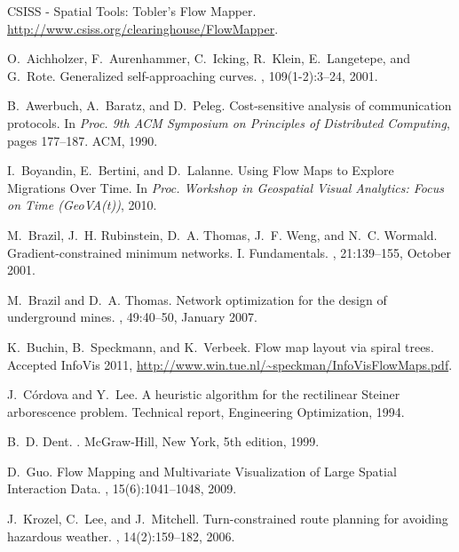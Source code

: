 \documentclass{journalA4}
\begin{document}
\begin{thebibliography}{21}

{CSISS - Spatial Tools: Tobler's Flow Mapper}.
\newblock \url{http://www.csiss.org/clearinghouse/FlowMapper}.

O.~Aichholzer, F.~Aurenhammer, C.~Icking, R.~Klein, E.~Langetepe, and G.~Rote.
\newblock Generalized self-approaching curves.
, 109(1-2):3--24, 2001.

B.~Awerbuch, A.~Baratz, and D.~Peleg.
\newblock Cost-sensitive analysis of communication protocols.
\newblock In {\em Proc. 9th ACM Symposium on Principles of Distributed
  Computing}, pages 177--187. ACM, 1990.

I.~Boyandin, E.~Bertini, and D.~Lalanne.
\newblock Using Flow Maps to Explore Migrations Over Time.
\newblock In {\em Proc. Workshop in Geospatial Visual Analytics: Focus on Time (GeoVA(t))}, 2010.

M.~Brazil, J.~H. Rubinstein, D.~A. Thomas, J.~F. Weng, and N.~C. Wormald.
\newblock Gradient-constrained minimum networks. {I. Fundamentals}.
, 21:139--155, October 2001.

M.~Brazil and D.~A. Thomas.
\newblock Network optimization for the design of underground mines.
, 49:40--50, January 2007.

K.~Buchin, B.~Speckmann, and K.~Verbeek.
\newblock Flow map layout via spiral trees.
\newblock Accepted InfoVis 2011,
  \url{http://www.win.tue.nl/~speckman/InfoVisFlowMaps.pdf}.

J.~C\'{o}rdova and Y.~Lee.
\newblock A heuristic algorithm for the rectilinear {Steiner} arborescence
  problem.
\newblock Technical report, Engineering Optimization, 1994.

B.~D. Dent.
.
\newblock McGraw-Hill, New York, 5th edition, 1999.

D.~Guo.
\newblock Flow Mapping and Multivariate Visualization of Large Spatial Interaction Data.
, 15(6):1041--1048, 2009.

J.~Krozel, C.~Lee, and J.~Mitchell.
\newblock Turn-constrained route planning for avoiding hazardous weather.
, 14(2):159--182, 2006.


\end{thebibliography}
\end{document}
